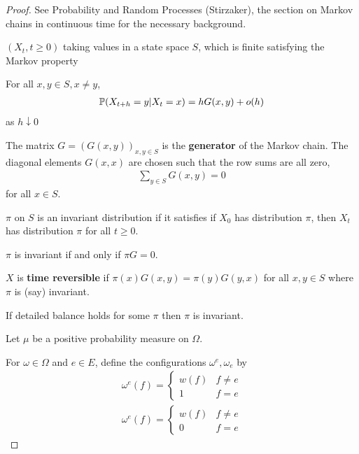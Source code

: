 \begin{proof}
  See Probability and Random Processes (Stirzaker), the section on
  Markov chains in continuous time for the necessary background.

  \begin{defn}
    \label{defn:random_walks_on_graphs:9}
    $(X_{t}, t \geq 0)$ taking values in a state space $S$, which is
    finite satisfying the Markov property 
  \end{defn}

  \begin{defn}
    \label{defn:random_walks_on_graphs:10}
    For all $x, y \in S, x \neq y$,
    \begin{align}
      \label{eq:5}
      \Prob{X_{t + h} = y | X_{t} = x} = h G(x, y) + o(h)
    \end{align} as $h \downarrow 0$

    The matrix $G = (G(x, y))_{x, y \in S}$ is the \textbf{generator}
    of the Markov chain.  The diagonal elements $G(x, x)$ are chosen
    such that the row sums are all zero,
    \begin{align}
      \label{eq:6}
      \sum_{y \in S} G(x, y) = 0
    \end{align} for all $x \in S$.
  \end{defn}

  \begin{defn}
    \label{defn:random_walks_on_graphs:11}
    $\pi$ on $S$ is an invariant distribution if it satisfies if
    $X_{0}$ has distribution $\pi$, then $X_{t}$ has distribution
    $\pi$ for all $t \geq 0$.
  \end{defn}

  \begin{lem}
    $\pi$ is invariant if and only if $\pi G = 0$.
  \end{lem}

  \begin{defn}
    \label{defn:random_walks_on_graphs:12}
    $X$ is \textbf{time reversible} if $\pi(x) G(x, y) = \pi(y) G(y,
    x)$ for all $x, y \in S$ where $\pi$ is (say) invariant.

    If detailed balance holds for some $\pi$ then $\pi$ is invariant.
  \end{defn}

  Let $\mu$ be a positive probability measure on $\Omega$.

  For $\omega \in \Omega$ and $e \in E$, define the configurations
  $\omega^{e}, \omega_{e}$ by
  \begin{align}
    \label{eq:7}
    \omega^{e}(f) = \begin{cases}
      w(f) & f \neq e \\
      1 & f = e
    \end{cases} \\
    \omega^{e}(f) = \begin{cases}
      w(f) & f \neq e \\
      0 & f = e
    \end{cases}
  \end{align}


\end{proof}
